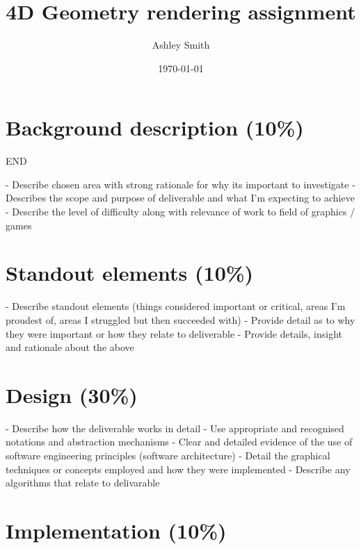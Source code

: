 \documentclass[11pt, a4paper]{article}
\begin{document}
\title{\titlefont 4D Geometry rendering assignment}
\author{Ashley Smith}
\date{\today}
\maketitle
\thispagestyle{empty}


\cleardoublepage
\setcounter{page}{1}
\tableofcontents

\cleardoublepage
{}
\setcounter{page}{1}

\section{Background description (10\%)}

END

- Describe chosen area with strong rationale for why its important to investigate
- Describes the scope and purpose of deliverable and what I'm expecting to achieve
- Describe the level of difficulty along with relevance of work to field of graphics / games

\section{Standout elements (10\%)}

- Describe standout elements (things considered important or critical, areas I'm proudest of, areas I struggled but then succeeded with)
- Provide detail as to why they were important or how they relate to deliverable
- Provide details, insight and rationale about the above

\section{Design (30\%)}

- Describe how the deliverable works in detail
- Use appropriate and recognised notations and abstraction mechanisms
- Clear and detailed evidence of the use of software engineering principles (software architecture)
- Detail the graphical techniques or concepts employed and how they were implemented
- Describe any algorithms that relate to delivarable

\section{Implementation (10\%)}
\end{document}
